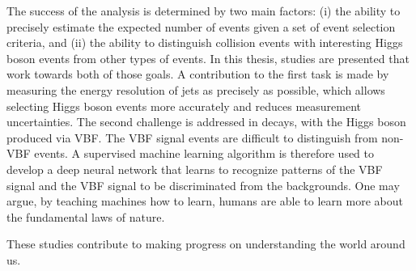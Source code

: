The success of the \HWWdet analysis is determined by two main factors: 
(i) the ability to precisely estimate the expected number of events given a set of event selection criteria, and (ii) the ability to distinguish collision events with interesting Higgs boson events from other types of events.
In this thesis, studies are presented that work towards both of those goals.
A contribution to the first task is made by measuring the energy resolution of jets as precisely as possible, which allows selecting Higgs boson events more accurately and reduces measurement uncertainties.
The second challenge is addressed in \HWWdet decays, with the Higgs boson produced via VBF.
The VBF signal events are difficult to distinguish from non-VBF events. 
A supervised machine learning algorithm is therefore used to develop a deep neural network that learns to recognize patterns of the VBF signal and the VBF signal to be discriminated from the backgrounds.
One may argue, by teaching machines how to learn, humans are able to learn more about the fundamental laws of nature. 

These studies contribute to making progress on understanding the world around us. 




